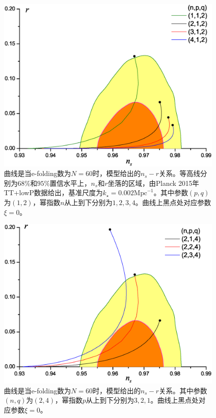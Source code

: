 \begin{figure}\small
  \centering
  \includegraphics[width=5in]{Img/Gn,1,2.eps}
  \caption{曲线是当e-folding数为$N=60$时，模型给出的$n_{s}-r$关系。等高线分别为$68\%$和$95\%$置信水平上，$n_{s}$和$r$坐落的区域，由Planck
  2015年TT+lowP数据给出，基准尺度为$k_{\star}=0.002\text{Mpc}^{-1}$。其中参数$(p,
q)$为$(1,2)$，幂指数$n$从上到下分别为$1,2,3,4$。曲线上黑点处对应参数$\xi=0$。}\label{fig:Gn-1-2}
\end{figure}


\begin{figure}\small
  \centering
  \includegraphics[width=5in]{Img/G2,p,4.eps}
  \caption{曲线是当e-folding数为$N=60$时，模型给出的$n_{s}-r$关系。其中参数$(n,
q)$为$(2,4)$，幂指数$p$从上到下分别为$3,2,1$。曲线上黑点处对应参数$\xi=0$。}\label{fig:G2-p-4}
\end{figure}

